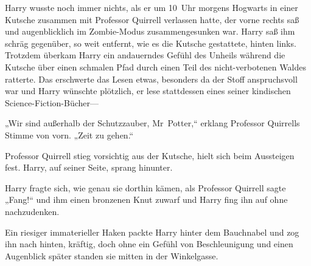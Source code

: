 Harry wusste noch immer nichts, als er um 10~Uhr morgens Hogwarts in einer Kutsche zusammen mit Professor Quirrell verlassen hatte, der vorne rechts saß und augenblicklich im Zombie-Modus zusammengesunken war. Harry saß ihm schräg gegenüber, so weit entfernt, wie es die Kutsche gestattete, hinten links. Trotzdem überkam Harry ein andauerndes Gefühl des Unheils während die Kutsche über einen schmalen Pfad durch einen Teil des nicht-verbotenen Waldes ratterte. Das erschwerte das Lesen etwas, besonders da der Stoff anspruchsvoll war und Harry wünschte plötzlich, er lese stattdessen eines seiner kindischen Science-Fiction-Bücher—

„Wir sind außerhalb der Schutzzauber, Mr~Potter,“ erklang Professor Quirrells Stimme von vorn. „Zeit zu gehen.“

Professor Quirrell stieg vorsichtig aus der Kutsche, hielt sich beim Aussteigen fest. Harry, auf seiner Seite, sprang hinunter.

Harry fragte sich, wie genau sie dorthin kämen, als Professor Quirrell sagte „Fang!“ und ihm einen bronzenen Knut zuwarf und Harry fing ihn auf ohne nachzudenken.

Ein riesiger immaterieller Haken packte Harry hinter dem Bauchnabel und zog ihn nach hinten, kräftig, doch ohne ein Gefühl von Beschleunigung und einen Augenblick später standen sie mitten in der Winkelgasse.

